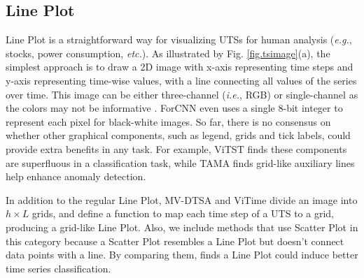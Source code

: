 


\vspace{-0.08cm}

\subsection{Line Plot}\label{sec.lineplot}

Line Plot is a straightforward way for visualizing UTSs for human analysis ({\em e.g.}, stocks, power consumption, {\em etc.}). As illustrated by Fig. \ref{fig.tsimage}(a), the simplest approach is to draw a 2D image with x-axis representing %
time steps and y-axis representing %
time-wise values, %
with a line connecting all values of the series over time. This image can be %
either three-channel ({\em i.e.}, RGB) or single-channel as the colors may not %
be informative %
\cite{cohen2020trading,sood2021visual,jin2023classification,zhang2023insight}. ForCNN \cite{semenoglou2023image} even uses a single 8-bit integer to represent each pixel for black-white images. So far, there is no consensus on whether other graphical components, such as legend, grids and tick labels, could provide extra benefits in any task. For example, ViTST \cite{li2023time} finds these components are superfluous in a classification task, while TAMA \cite{zhuang2024see} finds grid-like auxiliary lines help enhance anomaly detection.

In addition to the regular Line Plot, MV-DTSA \cite{yang2023your} and ViTime \cite{yang2024vitime} divide an image into $h\times L$ grids, %
and %
define a function to map each time step of a UTS to a grid, producing a grid-like Line Plot. Also, we include methods that use Scatter Plot \cite{daswani2024plots,prithyani2024feasibility} in this category because %
a Scatter Plot resembles a Line Plot but doesn't connect %
data points with a line. By comparing them, \cite{prithyani2024feasibility} finds a Line Plot could induce better time series classification.

